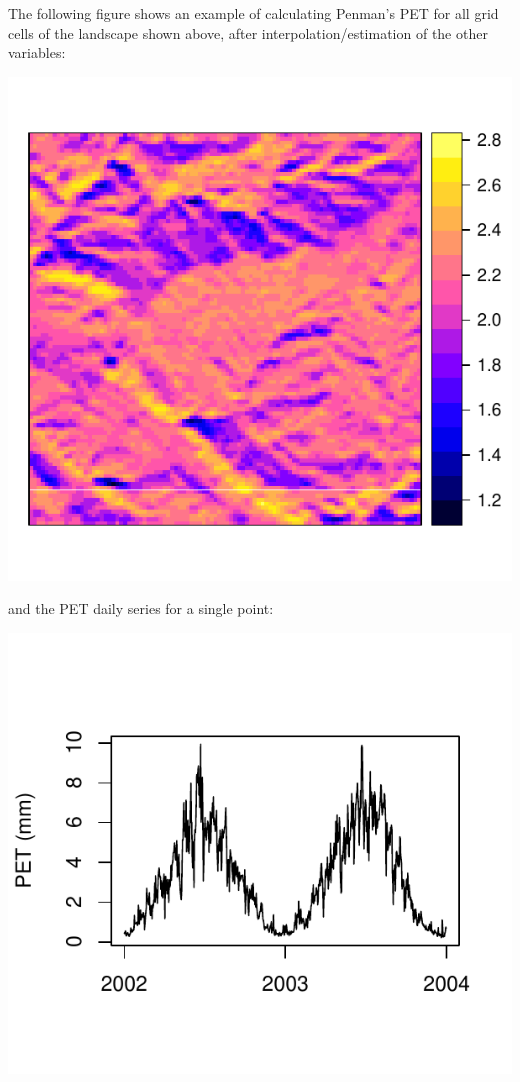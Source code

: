 \documentclass[11pt,a4paper]{article}
\begin{document}
The following figure shows an example of calculating Penman's PET for all grid cells of the landscape shown above, after interpolation/estimation of the other variables:
\begin{center}
\includegraphics{Meteorology-031}
\end{center}
and the PET daily series for a single point:
\begin{center}
\includegraphics{Meteorology-032}
\end{center}
\end{document}
